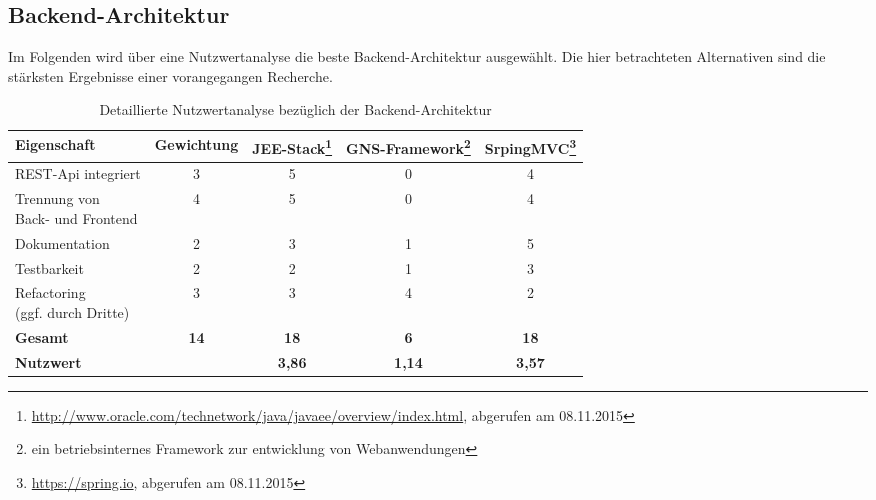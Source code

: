 \label{app:nutzwertanalyse}

\subsection{Backend-Architektur}

Im Folgenden wird über eine Nutzwertanalyse die beste Backend-Architektur ausgewählt.
Die hier betrachteten Alternativen sind die stärksten Ergebnisse einer vorangegangen Recherche. 

\begin{savenotes}
\begin{table}[H]
	\centering
	\begin{tabular}{lcccc}

		\rowcolor{white!15}				
		\textbf{Eigenschaft} 			& \textbf{Gewichtung}
			& \textbf{JEE-Stack\footnote{\url{http://www.oracle.com/technetwork/java/javaee/overview/index.html}, abgerufen am 08.11.2015}}
			& \textbf{GNS-Framework\footnote{ein betriebsinternes Framework zur entwicklung von Webanwendungen}}
			& \textbf{SrpingMVC\footnote{\url{https://spring.io}, abgerufen am 08.11.2015}} \\\hline		
		
		REST-Api integriert				& 3						& 5						& 0							& 4 \\
		\pbox{4cm}{Trennung von \\ Back- und Frontend}	& 4						& 5						& 0							& 4 \\						
		Dokumentation					& 2						& 3						& 1							& 5 \\
		Testbarkeit						& 2						& 2						& 1							& 3 \\
		\pbox{4cm}{Refactoring \\(ggf. durch Dritte)}	& 3						& 3						& 4							& 2 \\
		
		\rowcolor{MidnightBlue!15}
		\textbf{Gesamt}				& \textbf{14}			& \textbf{18}			& \textbf{6}				& \textbf{18} \\\hline
		\rowcolor{white!15}				
		\textbf{Nutzwert} 				& 						& \textbf{3,86}			& \textbf{1,14} 			& \textbf{3,57} \\
											
			    
	\end{tabular}
	
	\caption{Detaillierte Nutzwertanalyse bezüglich der Backend-Architektur}
	\label{tab:nutzwertanalyse_backend}
\end{table}
\end{savenotes}


